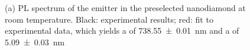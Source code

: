 					\begin{figure}[tp]
						\begin{subfigure}[t]{ 0.49\linewidth}
							\centering
							\label{subfig::spectrum_nd_multiple}
							\caption{}
						\end{subfigure}
						\hfill
						\begin{subfigure}[t]{ 0.49\linewidth}
							\centering
							\caption{}
							\label{subfig::spectrum_antenna_no_nd}
						\end{subfigure}
						\caption{(a) PL spectrum of the emitter in the preselected nanodiamond at room temperature. Black: experimental results; red: fit to experimental data, which yields a \ZPL \cwl of \SI{738.55\pm0.01}{nm} and a \lw of  \SI{5.09\pm0.03}{nm}}
					\end{figure}

